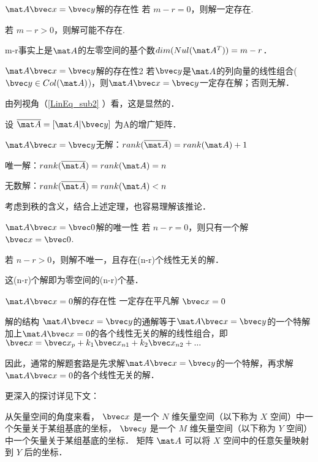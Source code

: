 \begin{theorem}{$\mat A \bvec x=\bvec y$解的存在性}
若 $m-r=0$，则解一定存在.

若 $m-r>0$，则解可能不存在.
\end{theorem}
m-r事实上是$\mat A$的左零空间的基个数$dim(Nul(\mat A^T))=m-r$．

\begin{theorem}{$\mat A \bvec x=\bvec y$解的存在性2}
若$\bvec y$是$\mat A$的列向量的线性组合($\bvec y \in Col(\mat A)$)，则$\mat A \bvec x=\bvec y$一定存在解；否则无解．
\end{theorem}
由列视角（\autoref{LinEq_sub2} ）看，这是显然的．

\begin{corollary}{}
设 $\overline{\mat A} = [\mat A | \bvec y] $ 为A的增广矩阵．

$\mat A \bvec x=\bvec y$无解：$rank(\overline{\mat A})=rank(\mat A)+1$

唯一解：$rank(\overline{\mat A})=rank(\mat A)=n$

无数解：$rank(\overline{\mat A})=rank(\mat A)<n$
\end{corollary}
考虑到秩的含义，结合上述定理，也容易理解该推论．

\begin{theorem}{$\mat A \bvec x=\bvec 0$解的唯一性}
若 $n-r=0$，则只有一个解 $\bvec x = \bvec 0$.

若 $n-r>0$，则解不唯一，且存在(n-r)个线性无关的解．
\end{theorem}
这(n-r)个解即为零空间的(n-r)个基．

\begin{theorem}{$\mat A \bvec x=0$解的存在性}
一定存在平凡解 $\bvec x=0$
\end{theorem}

\begin{theorem}{解的结构}
$\mat A \bvec x=\bvec y$的通解等于$\mat A \bvec x=\bvec y$的一个特解加上$\mat A \bvec x=0$的各个线性无关的解的线性组合，即$\bvec x = \bvec x_p +k_1\bvec x_{n1}+k_2\bvec x_{n2}+...$

因此，通常的解题套路是先求解$\mat A \bvec x=\bvec y$的一个特解，再求解$\mat A \bvec x=0$的各个线性无关的解．
\end{theorem}

更深入的探讨详见下文：

从矢量空间的角度来看， $\bvec x$ 是一个 $N$ 维矢量空间（以下称为 $X$ 空间）中一个矢量关于某组基底的坐标， $\bvec y$ 是一个 $M$ 维矢量空间（以下称为 $Y$ 空间）中一个矢量关于某组基底的坐标． 矩阵 $\mat A$ 可以将 $X$ 空间中的任意矢量映射到 $Y$ 后的坐标．

